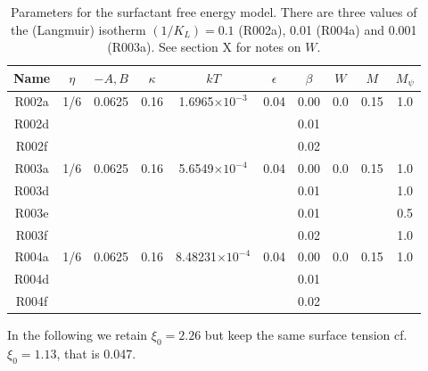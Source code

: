 \begin{table}[h]
\begin{center}
\begin{tabular}{|c|c|c|c|c|c|c|c|c|c|}
\hline
Name & $\eta$ & $-A,B$ & $\kappa$ & $kT$ & $\epsilon$ & $\beta$ & $W$
     & $M$ & $M_\psi$\\
\hline
R002a & 1/6 & 0.0625 & 0.16 & 1.6965$\times 10^{-3}$ & 0.04 & 0.00 & 0.0 
      & 0.15 & 1.0 \\
R002d &  &  &  & & & 0.01 &  &  &  \\
R002f &  &  &  & & & 0.02 &  &  &  \\
\hline
R003a & 1/6 & 0.0625 & 0.16 & 5.6549$\times 10^{-4}$ & 0.04 & 0.00 & 0.0 
      & 0.15 & 1.0 \\

R003d & &  & &  &  & 0.01 &  &  & 1.0\\
R003e & &  & &  &  & 0.01 &  &  & 0.5\\
R003f & &  & &  &  & 0.02 &  &  & 1.0\\
\hline
R004a & 1/6 & 0.0625 & 0.16 & 8.48231$\times 10^{-4}$ & 0.04 & 0.00 & 0.0 
      & 0.15 & 1.0 \\
R004d & &  &  &  & & 0.01 &  &  &  \\
R004f & &  &  &  & & 0.02 &  &  &  \\

\hline
\end{tabular}
\caption{Parameters for the surfactant free energy model. There are
three values of the (Langmuir) isotherm $(1/K_L) = 0.1$ (R002a),
0.01 (R004a) and 0.001 (R003a).
See section X for notes on $W$.}
\end{center}
\end{table}


In the following we retain $\xi_0 = 2.26$ but keep the same surface
tension cf. $\xi_0 = 1.13$, that is 0.047.

